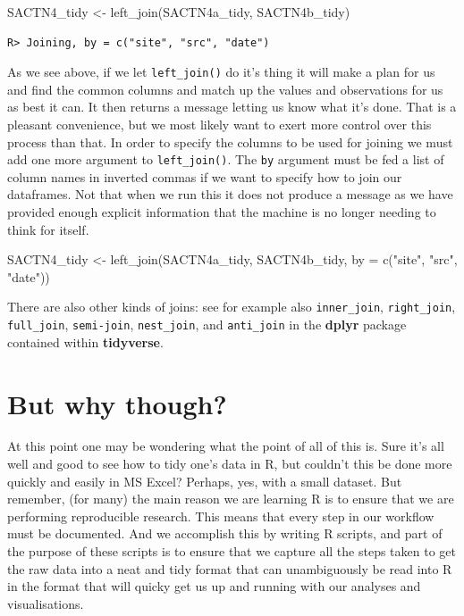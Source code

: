 \documentclass[
]{book}
\newenvironment{Shaded}{\begin{snugshade}}{\end{snugshade}}
\newcommand{\AttributeTok}[1]{\textcolor[rgb]{0.77,0.63,0.00}{#1}}
\newcommand{\FunctionTok}[1]{\textcolor[rgb]{0.00,0.00,0.00}{#1}}
\newcommand{\NormalTok}[1]{#1}
\newcommand{\OtherTok}[1]{\textcolor[rgb]{0.56,0.35,0.01}{#1}}
\newcommand{\StringTok}[1]{\textcolor[rgb]{0.31,0.60,0.02}{#1}}
\begin{document}
\begin{Shaded}
\begin{Highlighting}[]
\NormalTok{SACTN4\_tidy }\OtherTok{\textless{}{-}} \FunctionTok{left\_join}\NormalTok{(SACTN4a\_tidy, SACTN4b\_tidy)}
\end{Highlighting}
\end{Shaded}

\begin{verbatim}
R> Joining, by = c("site", "src", "date")
\end{verbatim}

As we see above, if we let \texttt{left\_join()} do it's thing it will make a plan for us and find the common columns and match up the values and observations for us as best it can. It then returns a message letting us know what it's done. That is a pleasant convenience, but we most likely want to exert more control over this process than that. In order to specify the columns to be used for joining we must add one more argument to \texttt{left\_join()}. The \texttt{by} argument must be fed a list of column names in inverted commas if we want to specify how to join our dataframes. Not that when we run this it does not produce a message as we have provided enough explicit information that the machine is no longer needing to think for itself.

\begin{Shaded}
\begin{Highlighting}[]
\NormalTok{SACTN4\_tidy }\OtherTok{\textless{}{-}} \FunctionTok{left\_join}\NormalTok{(SACTN4a\_tidy, SACTN4b\_tidy, }\AttributeTok{by =} \FunctionTok{c}\NormalTok{(}\StringTok{"site"}\NormalTok{, }\StringTok{"src"}\NormalTok{, }\StringTok{"date"}\NormalTok{))}
\end{Highlighting}
\end{Shaded}

There are also other kinds of joins: see for example also \texttt{inner\_join}, \texttt{right\_join}, \texttt{full\_join}, \texttt{semi-join}, \texttt{nest\_join}, and \texttt{anti\_join} in the \textbf{dplyr} package contained within \textbf{tidyverse}.

\hypertarget{but-why-though}{%
\section{But why though?}\label{but-why-though}}

At this point one may be wondering what the point of all of this is. Sure it's all well and good to see how to tidy one's data in R, but couldn't this be done more quickly and easily in MS Excel? Perhaps, yes, with a small dataset. But remember, (for many) the main reason we are learning R is to ensure that we are performing reproducible research. This means that every step in our workflow must be documented. And we accomplish this by writing R scripts, and part of the purpose of these scripts is to ensure that we capture all the steps taken to get the raw data into a neat and tidy format that can unambiguously be read into R in the format that will quicky get us up and running with our analyses and visualisations.
\end{document}
